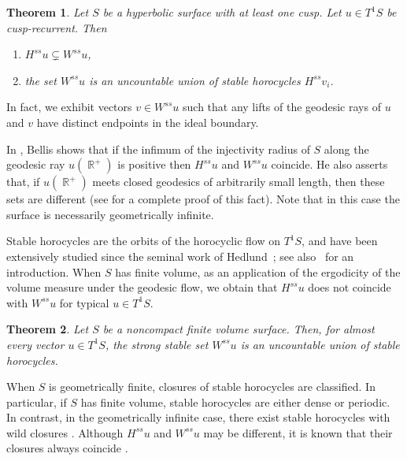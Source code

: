 \documentclass[a4paper,english,reqno]{amsart}
\DeclareMathOperator{\reals}{\mathbb{R}}
\newtheorem{theorem}{Theorem}%
\theoremstyle{definition}
\numberwithin{equation}{section}
\begin{document}
	\begin{theorem}\label{thm2}
		Let $S$ be a hyperbolic surface with at least one cusp. Let $u\in T^1S$ be cusp-recurrent. Then 
		\begin{enumerate}
			\item $H^{ss} u\subsetneq W^{ss}u$,
			\item the set $W^{ss}u$ is an uncountable union of stable horocycles $H^{ss} v_i$.
		\end{enumerate} 
	\end{theorem}
	
	In fact, we exhibit vectors $v \in W^{ss}u$ such that any lifts of the geodesic rays of $u$ and $v$ have distinct endpoints in the ideal boundary.
	
	In \cite{Bellis2018}, Bellis shows that if the infimum of the injectivity radius of $S$ along the geodesic ray $u(\reals^+)$ is positive then $H^{ss}u$ and $W^{ss}u$ coincide. He also asserts that, if $u(\reals^+)$ meets closed geodesics of arbitrarily small length, then these sets are different (see \cite{BurniolDalboHerrero2026} for a complete proof of this fact). Note that in this case the surface is necessarily geometrically infinite. 
	
	Stable horocycles are the orbits of the horocyclic flow on $T^1S$, and have been extensively studied since the seminal work of Hedlund~\cite{Hedlund36}; see also~\cite{dalbotrajectories} for an introduction. When $S$ has finite volume, as an application of the ergodicity of the volume measure under the geodesic flow, we obtain that $H^{ss}u$ does not coincide with $W^{ss}u$ for typical $u\in T^1S$.	
	\begin{theorem}\label{thm3}
		Let $S$ be a noncompact finite volume surface. Then, for almost every vector $u\in T^1 S$, the strong stable set $W^{ss}u$ is an uncountable union of stable horocycles.
	\end{theorem}
	
	When $S$ is geometrically finite, closures of stable horocycles are classified. In particular, if $S$ has finite volume, stable horocycles are either dense or periodic. In contrast, in the geometrically infinite case, there exist stable horocycles with wild closures \cite{Bellis2018,FarreLandesbergMinsky,FarreLandesbergMinsky24,DalboFarreLandesbergMinsky2026}. Although $H^{ss}u$ and $W^{ss}u$ may be different, it is known that their closures always coincide \cite[Corollary 8.3]{FarreLandesbergMinsky}.
	
\end{document}
